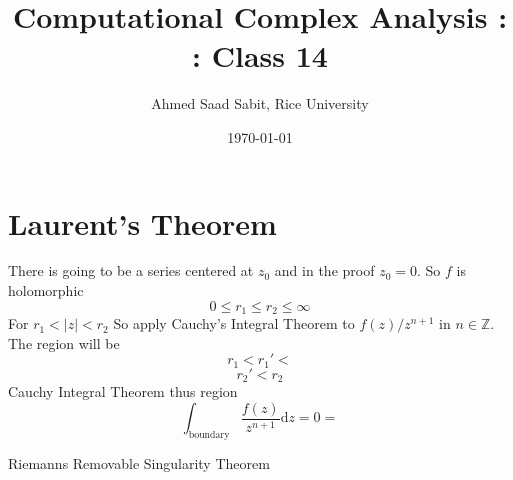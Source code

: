 \documentclass[letter]{article}
\title{Computational Complex Analysis : : Class 14}
\author{Ahmed Saad Sabit, Rice University}
\date{\today}
\begin{document}
\maketitle
\section*{Laurent's Theorem} 
There is going to be a series centered at $z_0$ and in the proof $z_0 = 0$. So $f$ is holomorphic 
\[
0 \le r_1 \le r_2 \le \infty
\] 
For 
$r_1 < | z| < r_2$ 
So apply Cauchy's Integral Theorem to $f(z) / z^{n+1}$ in $n \in \mathbb{Z}$. The region will be 
\[
r_1 < r_1 ' < 
\]
\[
r_2 ' < r_2
\] 
Cauchy Integral Theorem thus region 
\[
	\int_{\text{boundary}} \frac{f(z)}{z^{n+1} } \mathrm{d} z = 0 = 
\]

Riemanns Removable Singularity Theorem 
\end{document}
